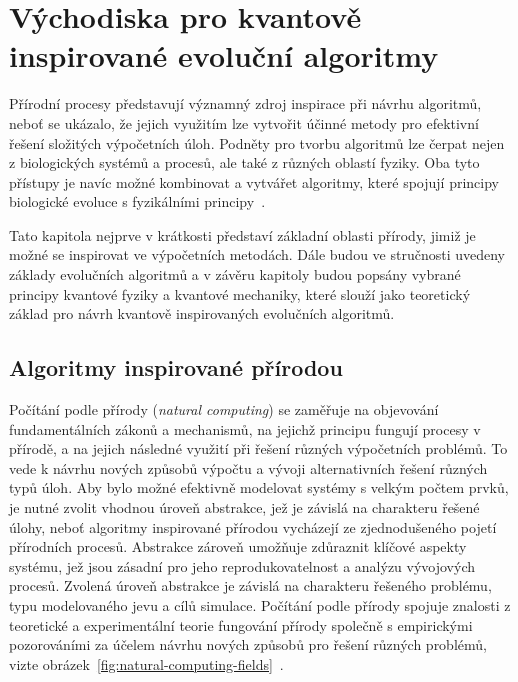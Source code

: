 \chapter{Východiska pro kvantově inspirované evoluční algoritmy}
Přírodní procesy představují významný zdroj inspirace při návrhu algoritmů, neboť se ukázalo, že jejich využitím lze vytvořit účinné metody pro efektivní řešení složitých výpočetních úloh.
Podněty pro tvorbu algoritmů lze čerpat nejen z biologických systémů a procesů, ale také z různých oblastí fyziky. 
Oba tyto přístupy je navíc možné kombinovat a vytvářet algoritmy, které spojují principy biologické evoluce s fyzikálními principy~\cite{NaturalComputing,NaturalComputing-handbook}.

Tato kapitola nejprve v krátkosti představí základní oblasti přírody, jimiž je možné se inspirovat ve výpočetních metodách. 
Dále budou ve stručnosti uvedeny základy evolučních algoritmů a v závěru kapitoly budou popsány vybrané principy kvantové fyziky a kvantové mechaniky, které slouží jako teoretický základ pro návrh kvantově inspirovaných evolučních algoritmů. 

\section{Algoritmy inspirované přírodou}
Počítání podle přírody (\emph{natural computing}) se zaměřuje na objevování fundamentálních zákonů a mechanismů, na jejichž principu fungují procesy v přírodě, a na jejich následné využití při řešení různých výpočetních problémů. 
To vede k návrhu nových způsobů výpočtu a vývoji alternativních řešení různých typů úloh. 
Aby bylo možné efektivně modelovat systémy s velkým počtem prvků, je nutné zvolit vhodnou úroveň abstrakce, jež je závislá na charakteru řešené úlohy, neboť algoritmy inspirované přírodou vycházejí ze zjednodušeného pojetí přírodních procesů. 
Abstrakce zároveň umožňuje zdůraznit klíčové aspekty systému, jež jsou zásadní pro jeho reprodukovatelnost a analýzu vývojových procesů. 
Zvolená úroveň abstrakce je závislá na charakteru řešeného problému, typu modelovaného jevu a cílů simulace. 
Počítání podle přírody spojuje znalosti z teoretické a experimentální teorie fungování přírody společně s empirickými pozorováními za účelem návrhu nových způsobů pro řešení různých problémů, vizte obrázek~\ref{fig:natural-computing-fields}~\cite{FundamentalNatural}.


